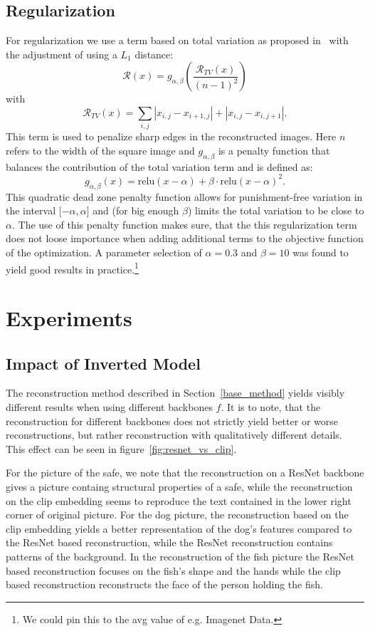 \documentclass[10pt,twocolumn]{article}
\begin{document}
\subsection{Regularization}\label{reg}
For regularization we use a term based on total variation as proposed in~\cite{mahendranUnderstandingDeepImage2015} with the adjustment of using a $L_1$ distance:
$$
\mathcal{R}(x) = g_{\alpha,\beta}\left(\dfrac{\mathcal{R}_{TV}(x)}{(n-1)^2}\right)
$$
with
$$
\mathcal{R}_{TV}(x) = \sum_{i,j} \left| x_{i,j} - x_{i + 1,j} \right| + \left| x_{i,j} - x_{i,j + 1} \right|.
$$
This term is used to penalize sharp edges in the reconstructed images.
Here $n$ refers to the width of the square image and $g_{\alpha,\beta}$ is a penalty function that balances the contribution of the total variation term and is defined as:
$$
g_{\alpha,\beta}(x) = \text{relu}(x - \alpha) + \beta\cdot\text{relu}(x - \alpha) ^ 2.
$$
This quadratic dead zone penalty function allows for punishment-free variation in the interval $\lbrack-\alpha,\alpha\rbrack$ and (for big enough $\beta$) limits the total variation to be close to $\alpha$.
The use of this penalty function makes sure, that the this regularization term does not loose importance when adding additional terms to the objective function of the optimization.
A parameter selection of $\alpha = 0.3$ and $\beta = 10$ was found to yield good results in practice.\footnote{We could pin this to the avg value of e.g. Imagenet Data.}

\section{Experiments}
\subsection{Impact of Inverted Model}
The reconstruction method described in Section~\ref{base_method} yields visibly different results when using different backbones $f$.
It is to note, that the reconstruction for different backbones does not strictly yield better or worse reconstructions, but rather reconstruction with qualitatively different details.
This effect can be seen in figure~\ref{fig:resnet_vs_clip}.

For the picture of the safe, we note that the reconstruction on a ResNet backbone gives a picture containg structural properties of a safe, while the reconstruction on the clip embedding seems to reproduce the text contained in the lower right corner of original picture.
For the dog picture, the reconstruction based on the clip embedding yields a better representation of the dog's features compared to the ResNet based reconstruction, while the ResNet reconstruction contains patterns of the background.
In the reconstruction of the fish picture the ResNet based reconstruction focuses on the fish's shape and the hands while the clip based reconstruction reconstructs the face of the person holding the fish.
\end{document}
